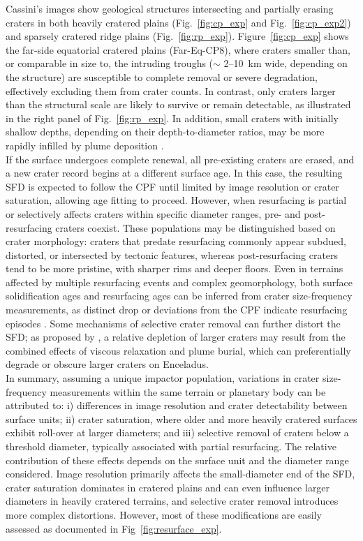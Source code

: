 \documentclass[preprint,11pt,3p,times,authoryear]{elsarticle}
\begin{document}
Cassini's images show geological structures intersecting and partially erasing craters in both heavily cratered plains (Fig.~\ref{fig:cp_exp} and Fig.~\ref{fig:cp_exp2}) and sparsely cratered ridge plains (Fig.~\ref{fig:rp_exp}). Figure~\ref{fig:cp_exp} shows the far-side equatorial cratered plains (Far-Eq-CP8), where craters smaller than, or comparable in size to, the intruding troughs ($\sim$ 2–10~km wide, depending on the structure) are susceptible to complete removal or severe degradation, effectively excluding them from crater counts. In contrast, only craters larger than the structural scale are likely to survive or remain detectable, as illustrated in the right panel of Fig.~\ref{fig:rp_exp}. In addition, small craters with initially shallow depths, depending on their depth-to-diameter ratios, may be more rapidly infilled by plume deposition \citep{Kirchoff2009}.\\

If the surface undergoes complete renewal, all pre-existing craters are erased, and a new crater record begins at a different surface age. In this case, the resulting SFD is expected to follow the CPF until limited by image resolution or crater saturation, allowing age fitting to proceed. However, when resurfacing is partial or selectively affects craters within specific diameter ranges, pre- and post-resurfacing craters coexist. These populations may be distinguished based on crater morphology: craters that predate resurfacing commonly appear subdued, distorted, or intersected by tectonic features, whereas post-resurfacing craters tend to be more pristine, with sharper rims and deeper floors. Even in terrains affected by multiple resurfacing events and complex geomorphology, both surface solidification ages and resurfacing ages can be inferred from crater size-frequency measurements, as distinct drop or deviations from the CPF indicate resurfacing episodes \citep{Michael2010}. Some mechanisms of selective crater removal can further distort the SFD; as proposed by \citet{Kirchoff2009}, a relative depletion of larger craters may result from the combined effects of viscous relaxation and plume burial, which can preferentially degrade or obscure larger craters on Enceladus.\\

In summary, assuming a unique impactor population, variations in crater size-frequency measurements within the same terrain or planetary body can be attributed to: i) differences in image resolution and crater detectability between surface units; ii) crater saturation, where older and more heavily cratered surfaces exhibit roll-over at larger diameters; and iii) selective removal of craters below a threshold diameter, typically associated with partial resurfacing. The relative contribution of these effects depends on the surface unit and the diameter range considered. Image resolution primarily affects the small-diameter end of the SFD, crater saturation dominates in cratered plains and can even influence larger diameters in heavily cratered terrains, and selective crater removal introduces more complex distortions. However, most of these modifications are easily assessed as documented in Fig~\ref{fig:resurface_exp}.\\
\end{document}
